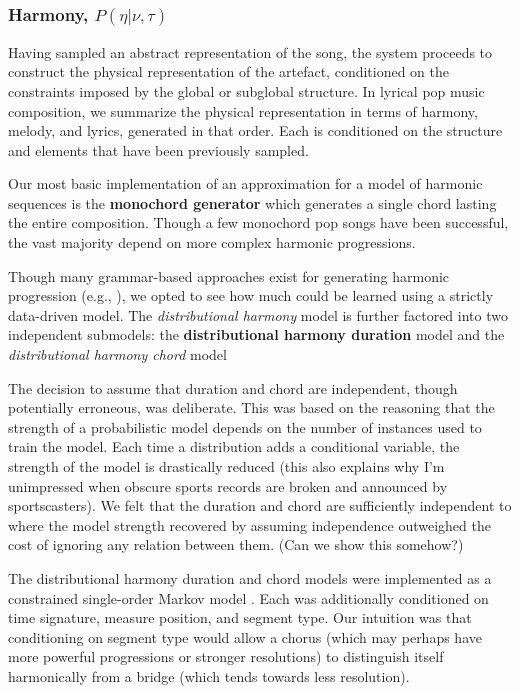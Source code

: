 \documentclass[letterpaper]{article}
\begin{document}
\subsubsection{Harmony, $P(\eta|\nu,\tau)$}

Having sampled an abstract representation of the song, the system proceeds to construct the physical representation of the artefact, conditioned on the constraints imposed by the global or subglobal structure. In lyrical pop music composition, we summarize the physical representation in terms of harmony, melody, and lyrics, generated in that order. Each is conditioned on the structure and elements that have been previously sampled.

Our most basic implementation of an approximation for a model of harmonic sequences is the \textbf{monochord generator} which generates a single chord lasting the entire composition. Though a few monochord pop songs have been successful, the vast majority depend on more complex harmonic progressions. 

Though many grammar-based approaches exist for generating harmonic progression (e.g., \cite{steedman1984generative}), we opted to see how much could be learned using a strictly data-driven model. The \textit{distributional harmony} model is further factored into two independent submodels: the \textbf{distributional harmony duration} model and the \textit{distributional harmony chord} model

The decision to assume that duration and chord are independent, though potentially erroneous, was deliberate. This was based on the reasoning that the strength of a probabilistic model depends on the number of instances used to train the model. Each time a distribution adds a conditional variable, the strength of the model is drastically reduced (this also explains why I'm unimpressed when obscure sports records are broken and announced by sportscasters). We felt that the duration and chord are sufficiently independent to where the model strength recovered by assuming independence outweighed the cost of ignoring any relation between them. (Can we show this somehow?)

The distributional harmony duration and chord models were implemented as a constrained single-order Markov model \cite{pachet2001finite}. Each was additionally conditioned on time signature, measure position, and segment type. Our intuition was that conditioning on segment type would allow a chorus (which may perhaps have more powerful progressions or stronger resolutions) to distinguish itself harmonically from a bridge (which tends towards less resolution).
\end{document}
